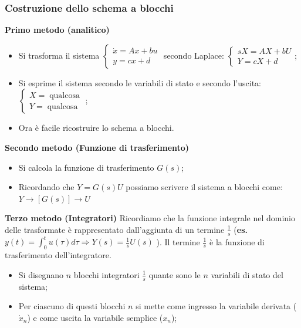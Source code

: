 \begin{landscape}
\begin{multicols*}{3}
    \subsubsection*{Costruzione dello schema a blocchi}
    \textbf{Primo metodo (analitico)}
    \begin{itemize}
        \item Si trasforma il sistema $\begin{cases}
            \dot{x} = A x + bu\\ y = cx +d
        \end{cases}$ secondo Laplace: $\begin{cases}
            s X = A X + b U\\ Y = c X + d
        \end{cases}$;
        \item Si esprime il sistema secondo le variabili di stato e secondo l'uscita:$\begin{cases}
            X = \;\text{qualcosa}\;\\ Y = \;\text{qualcosa}\;
        \end{cases}$;
        \item Ora è facile ricostruire lo schema a blocchi.
    \end{itemize}
    \textbf{Secondo metodo (Funzione di trasferimento)}
    \begin{itemize}
        \item Si calcola la funzione di trasferimento $G(s)$;
        \item Ricordando che $Y = G(s) U$ possiamo scrivere il sistema a blocchi come: $Y \longrightarrow \left[G(s)\right] \longrightarrow U$
    \end{itemize}
    \textbf{Terzo metodo (Integratori)}\newline
    Ricordiamo che la funzione integrale nel dominio delle trasformate è rappresentato dall'aggiunta di un termine $\frac{1}{s}$ (\textbf{es.} $y(t) = \int_{0}^{t}u(\tau)d \tau \Rightarrow Y(s) = \frac{1}{s} U(s)$ ).\newline
    Il termine $\frac{1}{s}$ è la funzione di trasferimento dell'integratore.
    \begin{itemize}
        \item Si disegnano $n$ blocchi integratori $\frac{1}{s}$ quante sono le $n$ variabili di stato del sistema;
        \item Per ciascuno di questi blocchi $n$ si mette come ingresso la variabile derivata ($\dot{x}_n$) e come uscita la variabile semplice ($x_n$);

\end{itemize}
\end{multicols*}
\end{landscape}
